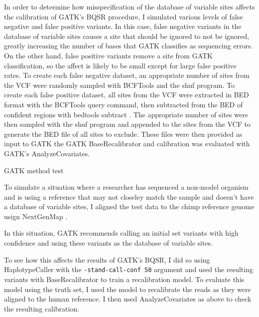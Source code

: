 \documentclass{article}
\begin{document}
\begin{outline}
\begin{outline}
		\item In order to determine how misspecification of the database of variable sites affects the calibration of GATK's BQSR procedure, I simulated various levels of false negative and false positive variants. In this case, false negative variants in the database of variable sites causes a site that should be ignored to not be ignored, greatly increasing the number of bases that GATK classifies as sequencing errors. On the other hand, false positive variants remove a site from GATK classification, so the affect is likely to be small except for large false positive rates. To create each false negative dataset, an appropriate number of sites from the VCF were randomly sampled with BCFTools and the shuf program. To create each false positive dataset, all sites from the VCF were extracted in BED format with the BCFTools query command, then subtracted from the BED of confident regions with bedtools subtract \parencite{quinlan_bedtools_2010}. The appropriate number of sites were then sampled with the shuf program and appended to the sites from the VCF to generate the BED file of all sites to exclude. These files were then provided as input to GATK the GATK BaseRecalibrator and calibration was evaluated with GATK's AnalyzeCovariates.
		\item GATK method test
		\begin{outline}
		\item To simulate a situation where a researcher has sequenced a non-model organism and is using a reference that may not closeley match the sample and doesn't have a database of variable sites, I aligned the test data to the chimp reference genome \parencite{waterson_initial_2005} usign NextGenMap \parencite{sedlazeck_nextgenmap_2013}. %
		\item In this situation, GATK recommends calling an initial set variants with high confidence and using these variants as the database of variable sites. %
		\item To see how this affects the results of GATK's BQSR, I did so using HaplotypeCaller with the \texttt{-stand-call-conf 50} argument and used the resulting variants with BaseRecalibrator to train a recalibration model. To evaluate this model using the truth set, I used the model to recalibrate the reads as they were aligned to the human reference. I then used AnalyzeCovariates as above to check the resulting calibration.
		\end{outline}
	\end{outline}
\end{outline}
\end{document}
